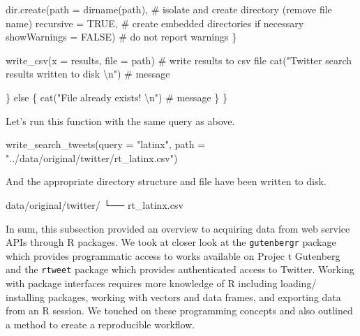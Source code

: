 \documentclass[
  letterpaper,
]{latex/krantz}
\newenvironment{Shaded}{\begin{snugshade}}{\end{snugshade}}
\newcommand{\AttributeTok}[1]{\textcolor[rgb]{0.40,0.45,0.13}{#1}}
\newcommand{\CommentTok}[1]{\textcolor[rgb]{0.37,0.37,0.37}{#1}}
\newcommand{\ConstantTok}[1]{\textcolor[rgb]{0.56,0.35,0.01}{#1}}
\newcommand{\ControlFlowTok}[1]{\textcolor[rgb]{0.00,0.23,0.31}{#1}}
\newcommand{\ExtensionTok}[1]{\textcolor[rgb]{0.00,0.23,0.31}{#1}}
\newcommand{\FunctionTok}[1]{\textcolor[rgb]{0.28,0.35,0.67}{#1}}
\newcommand{\NormalTok}[1]{\textcolor[rgb]{0.00,0.23,0.31}{#1}}
\newcommand{\SpecialCharTok}[1]{\textcolor[rgb]{0.37,0.37,0.37}{#1}}
\newcommand{\StringTok}[1]{\textcolor[rgb]{0.13,0.47,0.30}{#1}}
\begin{document}
\begin{Shaded}
\begin{Highlighting}[]
        \FunctionTok{dir.create}\NormalTok{(}\AttributeTok{path =} \FunctionTok{dirname}\NormalTok{(path), }\CommentTok{\# isolate and create directory (remove file name)}
                   \AttributeTok{recursive =} \ConstantTok{TRUE}\NormalTok{, }\CommentTok{\# create embedded directories if necessary}
                   \AttributeTok{showWarnings =} \ConstantTok{FALSE}\NormalTok{) }\CommentTok{\# do not report warnings}
\NormalTok{      \}}
      
      \FunctionTok{write\_csv}\NormalTok{(}\AttributeTok{x =}\NormalTok{ results, }\AttributeTok{file =}\NormalTok{ path) }\CommentTok{\# write results to csv file }
      \FunctionTok{cat}\NormalTok{(}\StringTok{"Twitter search results written to disk }\SpecialCharTok{\textbackslash{}n}\StringTok{"}\NormalTok{) }\CommentTok{\# message}
      
\NormalTok{    \} }\ControlFlowTok{else}\NormalTok{ \{}
      \FunctionTok{cat}\NormalTok{(}\StringTok{"File already exists! }\SpecialCharTok{\textbackslash{}n}\StringTok{"}\NormalTok{) }\CommentTok{\# message}
\NormalTok{    \}}
\NormalTok{  \}}
\end{Highlighting}
\end{Shaded}

Let's run this function with the same query as above.

\begin{Shaded}
\begin{Highlighting}[]
\FunctionTok{write\_search\_tweets}\NormalTok{(}\AttributeTok{query =} \StringTok{"latinx"}\NormalTok{, }\AttributeTok{path =} \StringTok{"../data/original/twitter/rt\_latinx.csv"}\NormalTok{)}
\end{Highlighting}
\end{Shaded}

And the appropriate directory structure and file have been written to
disk.

\begin{Shaded}
\begin{Highlighting}[]
\ExtensionTok{data/original/twitter/}
\ExtensionTok{└──}\NormalTok{ rt\_latinx.csv}
\end{Highlighting}
\end{Shaded}

In sum, this subsection provided an overview to acquiring data from web
service APIs through R packages. We took at closer look at the
\texttt{gutenbergr} package which provides programmatic access to works
available on Projec t Gutenberg and the \texttt{rtweet} package which
provides authenticated access to Twitter. Working with package
interfaces requires more knowledge of R including loading/ installing
packages, working with vectors and data frames, and exporting data from
an R session. We touched on these programming concepts and also outlined
a method to create a reproducible workflow.
\end{document}
